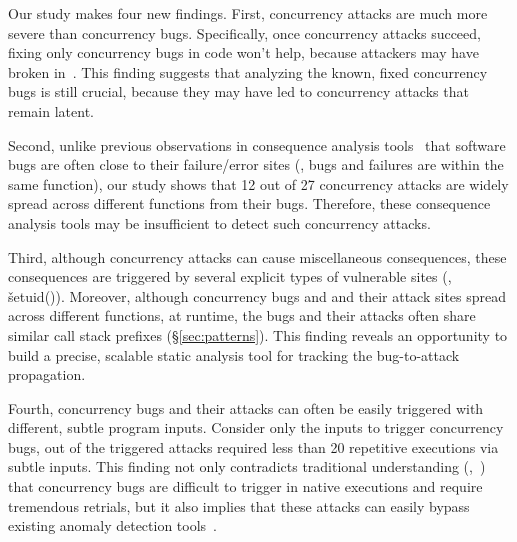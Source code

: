 
Our study makes four new findings. First, concurrency attacks are much 
more severe than concurrency bugs. Specifically, once concurrency attacks 
succeed, fixing only concurrency bugs in code won't help, 
because attackers may have 
broken in~\cite{freebsd-exploit-2009-3527,uselib-bug-12791,mysql-bug-24988}. 
This 
finding suggests that analyzing the known, fixed concurrency bugs is still 
crucial, because they may have led to concurrency attacks that remain latent.

Second, unlike previous observations in consequence analysis
tools~\cite{conseq:asplos11, li:hpca07, gu:dsn03} that software bugs are often 
close to their failure/error sites (\eg, bugs and failures are within the same 
function), our study shows that 12 out of 27 concurrency attacks are widely 
spread across different functions from their bugs. Therefore, these consequence 
analysis tools may be insufficient to detect such concurrency attacks.

Third, although concurrency attacks can cause miscellaneous consequences, 
these consequences are triggered by several explicit types of vulnerable sites 
(\eg, \v{setuid()}). Moreover, although concurrency bugs and and their attack 
sites spread across different functions, at runtime, the bugs and their attacks 
often share similar call stack prefixes (\S\ref{sec:patterns}). This finding 
reveals an opportunity to build a precise, scalable static analysis tool for 
tracking the bug-to-attack propagation.

Fourth, concurrency bugs and their attacks can often be easily triggered with 
different, subtle program inputs. Consider only the inputs to trigger 
concurrency bugs, \nreproducedNoRetry out of the \nreproduced triggered 
attacks required less than 20 repetitive executions via subtle inputs. This 
finding not only contradicts traditional understanding 
(\eg,~\cite{pres:sosp09,cui:tern:osdi10}) that concurrency bugs are difficult 
to trigger in native executions and require tremendous retrials, but it also 
implies that these attacks can easily bypass existing anomaly detection 
tools~\cite{schonberg:pldi89,taskrecycling:ppopp90,diduce:icse02}.

